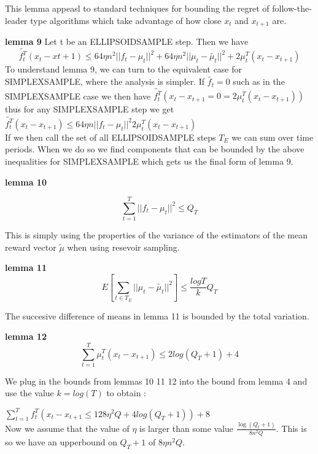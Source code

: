 This lemma appeasl to standard techniques for bounding the regret of follow-the-leader type algorithms which take advantage of how close $x_t$ and $x_{t+1}$ are.


\textbf{lemma 9}
Let t be an ELLIPSOIDSAMPLE step. Then we have 
\begin{equation}
\tilde{f_t^T}(x_t - x{t+1}) \leq 64 \eta n^2 ||f_t - \mu_t ||^2 + 64 \eta n^2 ||\mu_t -\tilde{\mu_t} ||^2 + 2 \mu_t^T (x_t - x_{t+1}) 
\end{equation} 
To understand lemma 9, we can turn to the equivalent case for SIMPLEXSAMPLE, where the analysis
is simpler. If $\tilde{f_t} = 0$ such as in the SIMPLEXSAMPLE case we then have 
$\tilde{f_t^T}(x_t - x_{t+1} = 0 = 2 \mu_t^T (x_t - x_{t+1}))$ thus for any SIMPLEXSAMPLE step
we get $\tilde{f_t^T}(x_t - x_{t+1}) \leq 64 \eta n ||f_t - \mu_t ||^2 2\mu_t^T (x_t - x_{t+1})$ \\

If we then call the set of all ELLIPSOIDSAMPLE steps $T_E$ we can sum over time periods.
When we do so we find components that can be bounded by the above inequalities for SIMPLEXSAMPLE
which gets us the final form of lemma 9.

\textbf{lemma 10}

\begin{equation}
\sum_{t=1}^T ||f_t - \mu_t||^2 \leq Q_T
\end{equation}

This is simply using the properties of the variance of the estimators of the mean
reward vector $\tilde{\mu}$ when using resevoir sampling.

\textbf{lemma 11}
\begin{equation}
E[\sum_{t \in T_E} ||\mu_t - \tilde{\mu_t} ||^2] \leq \frac{log T}{k} Q_T
\end{equation}

The succesive difference of means in lemma 11 is bounded by the total variation.

\textbf{lemma 12}
\begin{equation}
\sum_{t=1}^T \mu_t^T (x_t - x_{t+1}) \leq 2 log(Q_T + 1) + 4
\end{equation}

We plug in the bounds from lemmas 10 11 12 into the bound from lemma 4 and
use the value $k=log(T)$ to obtain :

$\sum_{t=1}^T f_t^T (x_t - x_{t+1} \leq 128 \eta^2Q + 4log(Q_T +1))+ 8$ \\

Now we assume that the value of $\eta$ is larger than some value $\frac{\log(Q_t +1)}{8 n^2 Q}$.
This is so we have an upperbound on $Q_T + 1$ of $8 \eta n^2 Q$. \\


